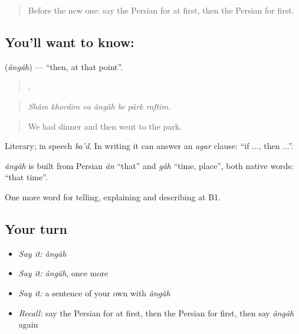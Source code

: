 \label{lesson:FA-C303-angah}



\begin{quote}
Before the new one: say the Persian for at first, then the Persian for first.
\end{quote}

\subsection*{You'll want to know: }
\textbf{} (\emph{ângâh}) — \textquotedblleft{}then, at that point\textquotedblright{}.

\begin{quote}
      .
\end{quote}

\begin{quote}
\emph{Shâm khordim va ângâh be pârk raftim.}
\end{quote}

\begin{quote}
We had dinner and then went to the park.
\end{quote}

Literary; in speech \emph{ba'd}. In writing it can answer an \emph{agar} clause: \textquotedblleft{}if ..., then ...\textquotedblright{}.

\begin{cousinweb}
\emph{ângâh} is built from Persian \emph{ân} \textquotedblleft{}that\textquotedblright{} and \emph{gâh} \textquotedblleft{}time, place\textquotedblright{}, both native words: \textquotedblleft{}that time\textquotedblright{}.
\end{cousinweb}

\begin{grammarlens}[title={What you've built}]
One more word for telling, explaining and describing at B1.
\end{grammarlens}

\subsection*{Your turn}
\begin{itemize}
\raggedright
  \item \emph{Say it:} \emph{ângâh}
  \item \emph{Say it:} \emph{ângâh}, once more
  \item \emph{Say it:} a sentence of your own with \emph{ângâh}
  \item \emph{Recall:} say the Persian for at first, then the Persian for first, then say \emph{ângâh} again
\end{itemize}


